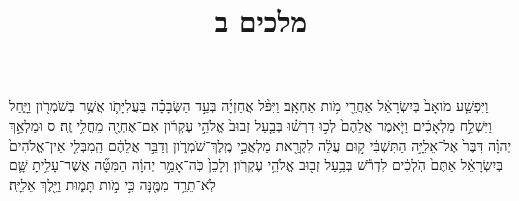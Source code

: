 \documentclass{openreader}
\title{מלכים ב}
\date{}
\begin{document}
\maketitle
\raggedbottom 
\fontsize{16pt}{24pt}\selectfont


וַיִּפְשַׁ֤ע מֹואָב֙ בְּיִשְׂרָאֵ֔ל אַחֲרֵ֖י מֹ֥ות אַחְאָֽב׃ 
וַיִּפֹּ֨ל אֲחַזְיָ֜ה בְּעַ֣ד הַשְּׂבָכָ֗ה בַּעֲלִיָּתֹ֛ו אֲשֶׁ֥ר בְּשֹׁמְרֹ֖ון וַיָּ֑חַל וַיִּשְׁלַ֣ח מַלְאָכִ֔ים וַיֹּ֤אמֶר אֲלֵהֶם֙ לְכ֣וּ דִרְשׁ֗וּ בְּבַ֤עַל זְבוּב֙ אֱלֹהֵ֣י עֶקְרֹ֔ון אִם־אֶחְיֶ֖ה מֵחֳלִ֥י זֶֽה׃ ס 
וּמַלְאַ֣ךְ יְהוָ֗ה דִּבֶּר֙ אֶל־אֵלִיָּ֣ה הַתִּשְׁבִּ֔י ק֣וּם עֲלֵ֔ה לִקְרַ֖את מַלְאֲכֵ֣י מֶֽלֶךְ־שֹׁמְרֹ֑ון וְדַבֵּ֣ר אֲלֵהֶ֔ם הַֽמִבְּלִ֤י אֵין־אֱלֹהִים֙ בְּיִשְׂרָאֵ֔ל אַתֶּם֙ הֹֽלְכִ֔ים לִדְרֹ֕שׁ בְּבַ֥עַל זְב֖וּב אֱלֹהֵ֥י עֶקְרֹֽון׃ 
וְלָכֵן֙ כֹּֽה־אָמַ֣ר יְהוָ֔ה הַמִּטָּ֞ה אֲשֶׁר־עָלִ֥יתָ שָּׁ֛ם לֹֽא־תֵרֵ֥ד מִמֶּ֖נָּה כִּ֣י מֹ֣ות תָּמ֑וּת וַיֵּ֖לֶךְ אֵלִיָּֽה׃ 
\end{document}
